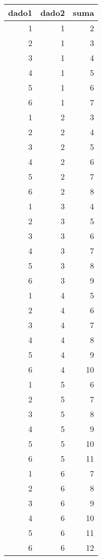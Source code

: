 \documentclass[
]{article}
\newenvironment{Shaded}{\begin{snugshade}}{\end{snugshade}}
\newcommand{\FunctionTok}[1]{\textcolor[rgb]{0.00,0.00,0.00}{#1}}
\newcommand{\NormalTok}[1]{#1}
\newcommand{\OtherTok}[1]{\textcolor[rgb]{0.56,0.35,0.01}{#1}}
\newcommand{\SpecialCharTok}[1]{\textcolor[rgb]{0.00,0.00,0.00}{#1}}
\begin{document}
\begin{longtable}[]{@{}rrr@{}}
\toprule
dado1 & dado2 & suma \\
\midrule
\endhead
1 & 1 & 2 \\
2 & 1 & 3 \\
3 & 1 & 4 \\
4 & 1 & 5 \\
5 & 1 & 6 \\
6 & 1 & 7 \\
1 & 2 & 3 \\
2 & 2 & 4 \\
3 & 2 & 5 \\
4 & 2 & 6 \\
5 & 2 & 7 \\
6 & 2 & 8 \\
1 & 3 & 4 \\
2 & 3 & 5 \\
3 & 3 & 6 \\
4 & 3 & 7 \\
5 & 3 & 8 \\
6 & 3 & 9 \\
1 & 4 & 5 \\
2 & 4 & 6 \\
3 & 4 & 7 \\
4 & 4 & 8 \\
5 & 4 & 9 \\
6 & 4 & 10 \\
1 & 5 & 6 \\
2 & 5 & 7 \\
3 & 5 & 8 \\
4 & 5 & 9 \\
5 & 5 & 10 \\
6 & 5 & 11 \\
1 & 6 & 7 \\
2 & 6 & 8 \\
3 & 6 & 9 \\
4 & 6 & 10 \\
5 & 6 & 11 \\
6 & 6 & 12 \\
\bottomrule
\end{longtable}

\begin{Shaded}
\end{Shaded}
\end{document}
